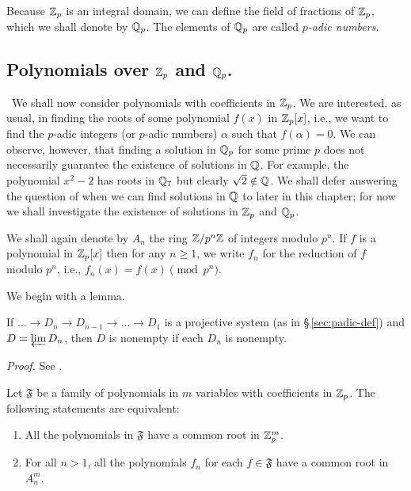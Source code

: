 Because \(\mathbb{Z}_p\) is an integral domain, we can define the field of fractions of \(\mathbb{Z}_p\), which we shall denote by \(\mathbb{Q}_p\). The elements of \(\mathbb{Q}_p\) are called \emph{\(p\)-adic numbers}.

\subsection{Polynomials over \(\mathbb{Z}_p\) and \(\mathbb{Q}_p\).}~We shall now consider polynomials with coefficients in \(\mathbb{Z}_p\). We are interested, as usual, in finding the roots of some polynomial \(f(x)\) in \(\mathbb{Z}_p[x]\), i.e., we want to find the \(p\)-adic integers (or \(p\)-adic numbers) \(\alpha\) such that \(f(\alpha) = 0\). We can observe, however, that finding a solution in \(\mathbb{Q}_p\) for some prime \(p\) does not necessarily guarantee the existence of solutions in \(\mathbb{Q}\). For example, the polynomial \(x^2 - 2\) has roots in \(\mathbb{Q}_7\) but clearly \(\sqrt{2} \notin \mathbb{Q}\). We shall defer answering the question of when we can find solutions in \(\mathbb{Q}\) to later in this chapter; for now we shall investigate the existence of solutions in \(\mathbb{Z}_p\) and \(\mathbb{Q}_p\).\label{sec:polynomials-over-zp}

We shall again denote by \(A_n\) the ring \(\mathbb{Z} / p^n \mathbb{Z}\) of integers modulo \(p^n\). If \(f\) is a polynomial in \(\mathbb{Z}_p[x]\) then for any \(n \geq 1\), we write \(f_n\) for the reduction of \(f\) modulo \(p^n\), i.e., \(f_n(x) = f(x) \pmod{p^n}\).

We begin with a lemma.

\begin{lemma}
    If \(\dots \to D_n \to D_{n - 1} \to \dots \to D_1\) is a projective system (as in {\normalfont \S\,\ref{sec:padic-def}}) and \(D = \varprojlim D_n\), then \(D\) is nonempty if each \(D_n\) is nonempty.
\end{lemma}

\emph{Proof.} See \cite[p.~13]{serre2012course}.

\begin{theoremx}\label{thm:zeros-of-polynomials-in-zp}
    Let \(\mathfrak{F}\) be a family of polynomials in \(m\) variables with coefficients in \(\mathbb{Z}_p\). The following statements are equivalent:

    \smallskip

    \begin{enumerate}[nosep, label=(\alph*)]
        \item All the polynomials in \(\mathfrak{F}\) have a common root in \(\mathbb{Z}_p^m\).
        \item For all \(n > 1\), all the polynomials \(f_n\) for each \(f \in \mathfrak{F}\) have a common root in \(A_n^m\).
    \end{enumerate}
\end{theoremx}


